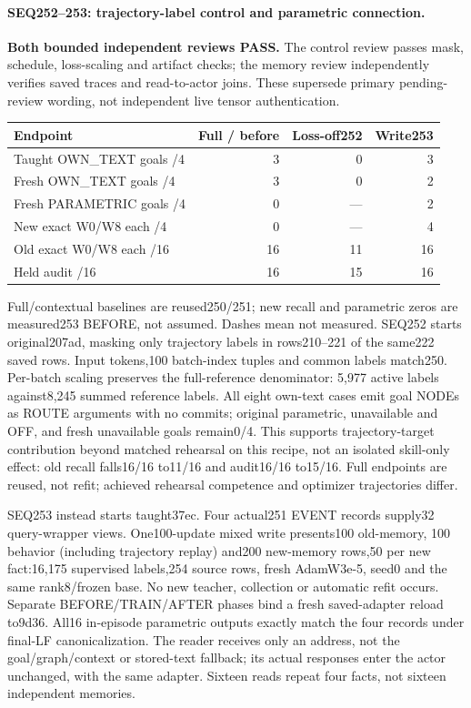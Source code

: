 \documentclass{article}
\begin{document}
\paragraph{SEQ252--253: trajectory-label control and parametric connection.}
\textbf{Both bounded independent reviews PASS.} The control review
passes mask, schedule, loss-scaling and artifact checks; the memory review
independently verifies saved traces and read-to-actor joins. These supersede
primary pending-review wording, not independent live tensor authentication.
\begin{center}
\small
\begin{tabular}{lrrr}
\toprule
Endpoint & Full / before & Loss-off252 & Write253 \\
\midrule
Taught OWN\_TEXT goals /4 & 3 & 0 & 3 \\
Fresh OWN\_TEXT goals /4 & 3 & 0 & 2 \\
Fresh PARAMETRIC goals /4 & 0 & --- & 2 \\
New exact W0/W8 each /4 & 0 & --- & 4 \\
Old exact W0/W8 each /16 & 16 & 11 & 16 \\
Held audit /16 & 16 & 15 & 16 \\
\bottomrule
\end{tabular}
\end{center}
Full/contextual baselines are reused250/251; new recall and parametric zeros
are measured253 BEFORE, not assumed. Dashes mean not measured.
SEQ252 starts original207ad, masking only trajectory labels in rows210--221
of the same222 saved rows. Input tokens,100 batch-index tuples and common
labels match250. Per-batch scaling preserves the full-reference denominator:
5,977 active labels against8,245 summed reference labels. All eight own-text
cases emit goal NODEs as ROUTE arguments with no commits; original parametric,
unavailable and OFF, and fresh unavailable goals remain0/4. This supports
trajectory-target contribution beyond matched rehearsal on this recipe, not
an isolated skill-only effect: old recall falls16/16 to11/16 and audit16/16
to15/16. Full endpoints are reused, not refit; achieved rehearsal competence
and optimizer trajectories differ.

SEQ253 instead starts taught37ec. Four actual251 EVENT records supply32
query-wrapper views. One100-update mixed write presents100 old-memory,
100 behavior (including trajectory replay) and200 new-memory rows,50 per new
fact:16,175 supervised labels,254 source rows, fresh AdamW3e-5, seed0 and the
same rank8/frozen base. No new teacher, collection or automatic refit occurs.
Separate BEFORE/TRAIN/AFTER phases bind a fresh saved-adapter reload to9d36.
All16 in-episode parametric outputs exactly match the four records under
final-LF canonicalization. The reader receives only an address, not the
goal/graph/context or stored-text fallback; its actual responses enter the
actor unchanged, with the same adapter. Sixteen reads repeat four facts,
not sixteen independent memories.
\end{document}
